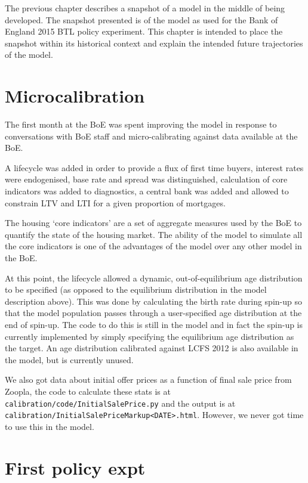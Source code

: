 \documentclass{report}
\begin{document}
The previous chapter describes a snapshot of a model in the middle of being developed. The snapshot presented is of the model as used for the Bank of England 2015 BTL policy experiment. This chapter is intended to place the snapshot within its historical context and explain the intended future trajectories of the model.

\section{Microcalibration}
The first month at the BoE was spent improving the model in response to conversations with BoE staff and micro-calibrating against data available at the BoE.

A lifecycle was added in order to provide a flux of first time buyers, interest rates were endogenised, base rate and spread was distinguished, calculation of core indicators was added to diagnostics, a central bank was added and allowed to constrain LTV and LTI for a given proportion of mortgages.

The housing `core indicators' are a set of aggregate measures used by the BoE to quantify the state of the housing market.  The ability of the model to simulate all the core indicators is one of the advantages of the model over any other model in the BoE.

At this point, the lifecycle allowed a dynamic, out-of-equilibrium age distribution to be specified (as opposed to the equilibrium distribution in the model description above). This was done by calculating the birth rate during spin-up so that the model population passes through a user-specified age distribution at the end of spin-up. The code to do this is still in the model and in fact the spin-up is currently implemented by simply specifying the equilibrium age distribution as the target. An age distribution calibrated against LCFS 2012 is also available in the model, but is currently unused.

We also got data about initial offer prices as a function of final sale price from Zoopla, the code to calculate these stats is at \texttt{calibration/code/InitialSalePrice.py} and the output is at \texttt{calibration/InitialSalePriceMarkup<DATE>.html}. However, we never got time to use this in the model.

\section{First policy expt}
\end{document}
